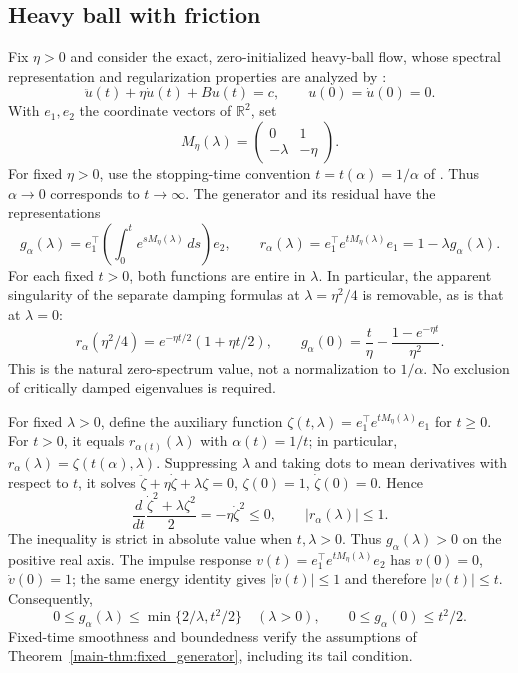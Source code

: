 \documentclass[11pt,a4paper,leqno]{article}
\numberwithin{equation}{section}
\numberwithin{figure}{section}
\numberwithin{table}{section}
\theoremstyle{plain}
\theoremstyle{definition}
\theoremstyle{remark}
\begin{document}
\subsection{Heavy ball with friction}

Fix $\eta>0$ and consider the exact, zero-initialized heavy-ball flow,
whose spectral representation and regularization properties are analyzed by
\citet[Section~5, Lemma~16]{bot2022convergence}:
\begin{equation*}
 \ddot u(t)+\eta\dot u(t)+Bu(t)=c,\qquad
 u(0)=\dot u(0)=0.
\end{equation*}
With $e_1,e_2$ the coordinate vectors of $\mathbb R^2$, set
\[
 M_\eta(\lambda)=
 \begin{pmatrix}0&1\\-\lambda&-\eta\end{pmatrix}.
\]
For fixed $\eta>0$, use the stopping-time convention $t=t(\alpha)=1/\alpha$ of \citet[Example~3.6]{wang2024linear}. Thus $\alpha\to0$ corresponds to $t\to\infty$. The generator and its residual have the representations
\begin{equation}\label{eq:verified_hbf_entire}
 g_\alpha(\lambda)=e_1^\top\!\left(\int_0^t e^{sM_\eta(\lambda)}\,ds\right)e_2,
 \qquad
 r_\alpha(\lambda)=e_1^\top e^{tM_\eta(\lambda)}e_1
             =1-\lambda g_\alpha(\lambda).
\end{equation}
For each fixed $t>0$, both functions are entire in $\lambda$.
In particular, the apparent singularity of the separate damping
formulas at $\lambda=\eta^2/4$ is removable, as is that at $\lambda=0$:
\begin{equation*}
 r_\alpha(\eta^2/4)=e^{-\eta t/2}(1+\eta t/2),\qquad
 g_\alpha(0)=\frac t\eta-\frac{1-e^{-\eta t}}{\eta^2}.
\end{equation*}
This is the natural zero-spectrum value, not a normalization to $1/\alpha$. No exclusion of critically damped eigenvalues is required.

For fixed $\lambda>0$, define the auxiliary function
$\zeta(t,\lambda)=e_1^\top e^{tM_\eta(\lambda)}e_1$ for $t\geq0$.
For $t>0$, it equals $r_{\alpha(t)}(\lambda)$ with $\alpha(t)=1/t$;
in particular, $r_\alpha(\lambda)=\zeta(t(\alpha),\lambda)$.
Suppressing $\lambda$ and taking dots to mean derivatives with respect to $t$, it solves
$\ddot\zeta+\eta\dot\zeta+\lambda\zeta=0$,
$\zeta(0)=1$, $\dot\zeta(0)=0$. Hence
\[
 \frac{d}{dt}\frac{\dot\zeta^2+\lambda\zeta^2}{2}
       =-\eta\dot\zeta^2\leq0,
 \qquad |r_\alpha(\lambda)|\leq1.
\]
The inequality is strict in absolute value when $t,\lambda>0$.
Thus $g_\alpha(\lambda)>0$ on the positive real axis.
The impulse response $v(t)=e_1^\top e^{tM_\eta(\lambda)}e_2$
has $v(0)=0$, $\dot v(0)=1$; the same energy identity gives
$|\dot v(t)|\leq1$ and therefore $|v(t)|\leq t$.
Consequently,
\begin{equation}\label{eq:verified_hbf_gain}
 0\leq g_\alpha(\lambda)\leq\min\{2/\lambda,t^2/2\}\quad(\lambda>0),
 \qquad 0\leq g_\alpha(0)\leq t^2/2.
\end{equation}
Fixed-time smoothness and boundedness verify the assumptions of
Theorem~\ref{main-thm:fixed_generator}, including its tail condition.
\end{document}
